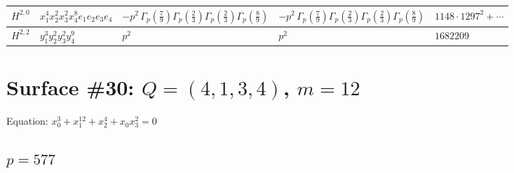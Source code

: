 \documentclass[11pt]{article}
\begin{document}
\begin{table}[ht]
{\begin{tabular}{@{}lllll@{}}
\midrule
$H^{2,0}$ & $x_{1}^{4} x_{2}^{2} x_{3}^{2} x_{4}^{8}  e_{1} e_{2} e_{3} e_{4}$ & $- p^{2} \, \Gamma_p \left( \frac{7}{9} \right) \Gamma_p \left( \frac{2}{3} \right) \Gamma_p \left( \frac{2}{3} \right) \Gamma_p \left( \frac{8}{9} \right)$ & $- p^{2} \, \Gamma_p \left( \frac{7}{9} \right) \Gamma_p \left( \frac{2}{3} \right) \Gamma_p \left( \frac{2}{3} \right) \Gamma_p \left( \frac{8}{9} \right)$ & $1148{\cdot}1297^{2}{+}\cdots$ \\
\midrule
$H^{2,2}$ & $y_{1}^{3} y_{2}^{2} y_{3}^{2} y_{4}^{9}$ & $p^{2} \,$ & $p^{2} \,$ & $1682209$ \\
\bottomrule
\end{tabular}
}
\renewcommand{\arraystretch}{1.0}
\end{table}

\newpage

\section*{Surface \#30: $Q=(4, 1, 3, 4)$, $m=12$}

Equation: $x_0^{3} + x_1^{12} + x_2^{4} + x_0 x_3^{2} = 0$

\subsection*{$p = 577$}
\end{document}
